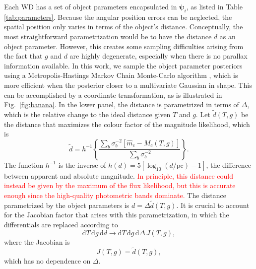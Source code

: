 \documentclass[fleqn,usenatbib]{mnras}
\newcommand{\changes}[1]{\textcolor{red}{#1}}
\newcommand{\objp}{\boldsymbol{\psi}}
\newcommand{\Teff}{T}
\newcommand{\logg}{g}
\newcommand{\de}{\text{d}}
\begin{document}
Each WD has a set of object parameters encapsulated in $\objp_i$, as listed in Table \ref{tab:parameters}. Because the angular position errors can be neglected, the spatial position only varies in terms of the object's distance. Conceptually, the most straightforward parametrization would be to have the distance $d$ as an object parameter. However, this creates some sampling difficulties arising from the fact that $\logg$ and $d$ are highly degenerate, especially when there is no parallax information available. In this work, we sample the object parameter posteriors using a Metropolis-Hastings Markov Chain Monte-Carlo algorithm \citep{1953JChPh..21.1087M,brooks2011handbook}, which is more efficient when the posterior closer to a multivariate Gaussian in shape. This can be accomplished by a coordinate transformation, as is illustrated in Fig.~\ref{fig:banana}. In the lower panel, the distance is parametrized in terms of $\Delta$, which is the relative change to the ideal distance given $\Teff$ and $\logg$. Let $\tilde{d}(\Teff,\logg)$ be the distance that maximizes the colour factor of the magnitude likelihood, which is
\begin{equation}
	\tilde{d} = 
    h^{-1}\left\{ \frac{\sum_b \sigma_b^{-2} [\hat{m}_c-M_c(\Teff,\logg)]}{\sum_b \sigma_b^{-2}} \right\}.
\end{equation}
The function $h^{-1}$ is the inverse of $h(d)=5[\log_{10}(d/\text{pc})-1]$, the difference between apparent and absolute magnitude. \changes{In principle, this distance could instead be given by the maximum of the flux likelihood, but this is accurate enough since the high-quality photometric bands dominate.} The distance parametrized by the object parameters is $d=\Delta\tilde{d}(\Teff,\logg)$. It is crucial to account for the Jacobian factor that arises with this parametrization, in which the differentials are replaced according to
\begin{equation}
	\de \Teff\, \de \logg\, \de d \rightarrow \de \Teff\, \de \logg\, \de \Delta\, J(\Teff,\logg),
\end{equation}
where the Jacobian is
\begin{equation}
	J(\Teff,\logg) = \tilde{d}(\Teff,\logg),
\end{equation}
which has no dependence on $\Delta$.
\end{document}
